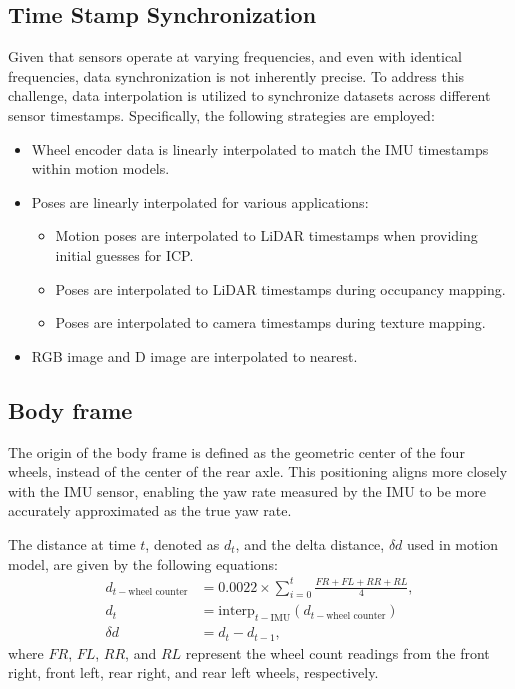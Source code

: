 \documentclass[conference]{IEEEtran}
\begin{document}
\subsection{Time Stamp Synchronization}
Given that sensors operate at varying frequencies, 
and even with identical frequencies, 
data synchronization is not inherently precise. 
To address this challenge, data interpolation is utilized to synchronize datasets 
across different sensor timestamps.
Specifically, the following strategies are employed:
\begin{itemize}
\item Wheel encoder data is linearly interpolated to match the IMU timestamps within motion models. 
\item Poses are linearly interpolated for various applications:
\begin{itemize}
\item Motion poses are interpolated to LiDAR timestamps when providing initial guesses for ICP.
\item Poses are interpolated to LiDAR timestamps during occupancy mapping.
\item Poses are interpolated to camera timestamps during texture mapping.
\end{itemize}
\item RGB image and D image are interpolated to nearest.
\end{itemize}


\subsection{Body frame}
The origin of the body frame is defined as the geometric center of the four wheels, 
instead of the center of the rear axle. 
This positioning aligns more closely with the IMU sensor, 
enabling the yaw rate measured by the IMU to be more accurately approximated as 
the true yaw rate.

The distance at time \(t\), denoted as \(d_t\), 
and the delta distance, \(\delta d\) used in motion model, 
are given by the following equations:
$$
\begin{aligned}
d_{t-\text{wheel counter}} &= 0.0022 \times \sum_{i=0}^{t} \frac{FR + FL + RR + RL}{4}, \\
d_{t} &= \text{interp}_{t-\text{IMU}}(d_{t-\text{wheel counter}})\\
\delta d &= d_{t} - d_{t-1},
\end{aligned}
$$
where $FR$, $FL$, $RR$, and $RL$ represent the wheel count readings 
from the front right, front left, rear right, and rear left wheels, respectively.
\end{document}
